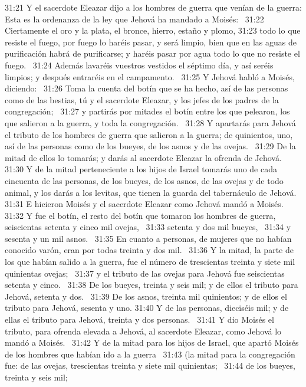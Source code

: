 31:21 Y el sacerdote Eleazar dijo a los hombres de guerra que venían de la guerra: Esta es la ordenanza de la ley que Jehová ha mandado a Moisés:  
31:22 Ciertamente el oro y la plata, el bronce, hierro, estaño y plomo, 
31:23 todo lo que resiste el fuego, por fuego lo haréis pasar, y será limpio, bien que en las aguas de purificación habrá de purificarse; y haréis pasar por agua todo lo que no resiste el fuego.  
31:24 Además lavaréis vuestros vestidos el séptimo día, y así seréis limpios; y después entraréis en el campamento.  
31:25 Y Jehová habló a Moisés, diciendo:  
31:26 Toma la cuenta del botín que se ha hecho, así de las personas como de las bestias, tú y el sacerdote Eleazar, y los jefes de los padres de la congregación;  
31:27 y partirás por mitades el botín entre los que pelearon, los que salieron a la guerra, y toda la congregación.  
31:28 Y apartarás para Jehová el tributo de los hombres de guerra que salieron a la guerra; de quinientos, uno, así de las personas como de los bueyes, de los asnos y de las ovejas.  
31:29 De la mitad de ellos lo tomarás; y darás al sacerdote Eleazar la ofrenda de Jehová.  
31:30 Y de la mitad perteneciente a los hijos de Israel tomarás uno de cada cincuenta de las personas, de los bueyes, de los asnos, de las ovejas y de todo animal, y los darás a los levitas, que tienen la guarda del tabernáculo de Jehová.  
31:31 E hicieron Moisés y el sacerdote Eleazar como Jehová mandó a Moisés.  
31:32 Y fue el botín, el resto del botín que tomaron los hombres de guerra, seiscientas setenta y cinco mil ovejas,  
31:33 setenta y dos mil bueyes,  
31:34 y sesenta y un mil asnos.  
31:35 En cuanto a personas, de mujeres que no habían conocido varón, eran por todas treinta y dos mil.  
31:36 Y la mitad, la parte de los que habían salido a la guerra, fue el número de trescientas treinta y siete mil quinientas ovejas;  
31:37 y el tributo de las ovejas para Jehová fue seiscientas setenta y cinco.  
31:38 De los bueyes, treinta y seis mil; y de ellos el tributo para Jehová, setenta y dos.  
31:39 De los asnos, treinta mil quinientos; y de ellos el tributo para Jehová, sesenta y uno. 
31:40 Y de las personas, dieciséis mil; y de ellas el tributo para Jehová, treinta y dos personas.  
31:41 Y dio Moisés el tributo, para ofrenda elevada a Jehová, al sacerdote Eleazar, como Jehová lo mandó a Moisés.  
31:42 Y de la mitad para los hijos de Israel, que apartó Moisés de los hombres que habían ido a la guerra  
31:43 (la mitad para la congregación fue: de las ovejas, trescientas treinta y siete mil quinientas;  
31:44 de los bueyes, treinta y seis mil;  

